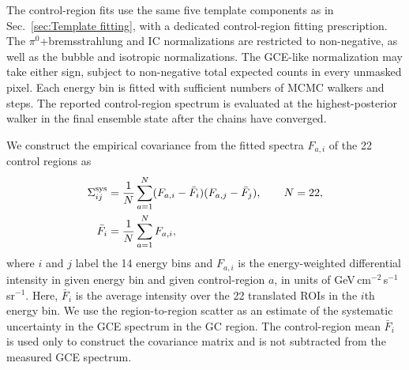 \documentclass[superscriptaddress,
showpacs,preprintnumbers,nofootinbib,eqsecnum,amsmath,amssymb,aps,11pt, groupedaddress, floatfix]{revtex4-2}
\begin{document}
The control-region fits use the same five template components as in
Sec.~\ref{sec:Template fitting}, with a dedicated control-region
fitting prescription. The $\pi^0$+bremsstrahlung and IC normalizations
are restricted to non-negative, as well as the bubble and isotropic
normalizations. The GCE-like normalization may take
either sign, subject to non-negative total expected counts in every
unmasked pixel. Each energy bin is fitted with sufficient numbers of MCMC walkers and steps. The reported control-region spectrum is evaluated at
the highest-posterior walker in the final ensemble state after the chains have converged.

We construct the empirical covariance from the fitted spectra
$F_{a,i}$ of the 22 control regions as
\begin{align}
\Sigma^{\rm sys}_{ij}
 &= \frac{1}{N}\sum_{a=1}^{N}
    (F_{a,i}-\bar F_i)(F_{a,j}-\bar F_j),
    \qquad N=22,\\
\bar F_i &= \frac{1}{N}\sum_{a=1}^{N}F_{a,i},
\end{align}
where $i$ and $j$ label the 14 energy bins and $F_{a,i}$ is the energy-weighted differential intensity in given energy bin and given control-region $a$, in units of GeV\,cm$^{-2}$\,s$^{-1}$\,sr$^{-1}$. Here, $\bar{F}_i$ is the average intensity over the 22 translated ROIs in the $i$th energy bin. We use the region-to-region scatter as an estimate of the systematic uncertainty in the GCE spectrum in the GC region. The control-region mean $\bar{F}_i$ is used only to construct the covariance matrix and is not subtracted from the measured GCE spectrum.
  
\end{document}
